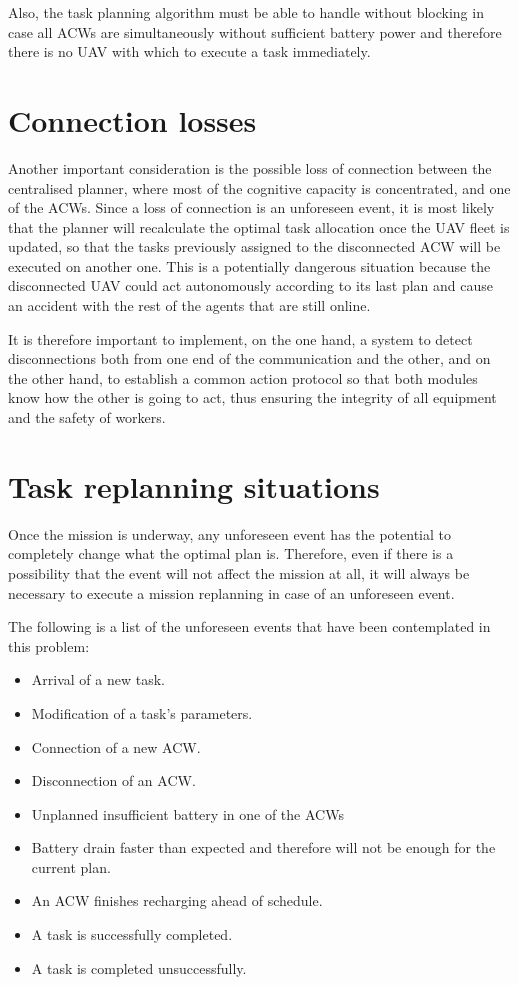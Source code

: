 Also, the task planning algorithm must be able to handle without blocking in case all \glspl{ACW} are simultaneously without sufficient battery power and therefore there is no \gls{UAV} with which to execute a task immediately.

\section{Connection losses}
\label{sec:ConnectionLosses}
Another important consideration is the possible loss of connection between the centralised planner, where most of the cognitive capacity is concentrated, and one of the \glspl{ACW}. Since a loss of connection is an unforeseen event, it is most likely that the planner will recalculate the optimal task allocation once the \gls{UAV} fleet is updated, so that the tasks previously assigned to the disconnected \gls{ACW} will be executed on another one. This is a potentially dangerous situation because the disconnected \gls{UAV} could act autonomously according to its last plan and cause an accident with the rest of the agents that are still online.

It is therefore important to implement, on the one hand, a system to detect disconnections both from one end of the communication and the other, and on the other hand, to establish a common action protocol so that both modules know how the other is going to act, thus ensuring the integrity of all equipment and the safety of workers.

\section{Task replanning situations} %
\label{sec:TaskReplanningSituations}
Once the mission is underway, any unforeseen event has the potential to completely change what the optimal plan is. Therefore, even if there is a possibility that the event will not affect the mission at all, it will always be necessary to execute a mission replanning in case of an unforeseen event.

The following is a list of the unforeseen events that have been contemplated in this problem:

\begin{itemize}
    \item Arrival of a new task.
    \item Modification of a task's parameters.
    \item Connection of a new \gls{ACW}.
    \item Disconnection of an \gls{ACW}.
    \item Unplanned insufficient battery in one of the \glspl{ACW}
    \item Battery drain faster than expected and therefore will not be enough for the current plan.
    \item An \gls{ACW} finishes recharging ahead of schedule.
    \item A task is successfully completed.
    \item A task is completed unsuccessfully.
\end{itemize}

